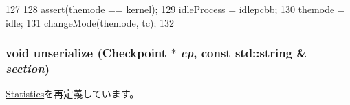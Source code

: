 \begin{DoxyCode}
127 {
128     assert(themode == kernel);
129     idleProcess = idlepcbb;
130     themode = idle;
131     changeMode(themode, tc);
132 }
\end{DoxyCode}
\hypertarget{classAlphaISA_1_1Kernel_1_1Statistics_af22e5d6d660b97db37003ac61ac4ee49}{
\subsubsection[{unserialize}]{\setlength{\rightskip}{0pt plus 5cm}void unserialize ({\bf Checkpoint} $\ast$ {\em cp}, \/  const std::string \& {\em section})}}
\label{classAlphaISA_1_1Kernel_1_1Statistics_af22e5d6d660b97db37003ac61ac4ee49}


\hyperlink{classKernel_1_1Statistics_af100c4e9feabf3cd918619c88c718387}{Statistics}を再定義しています。

